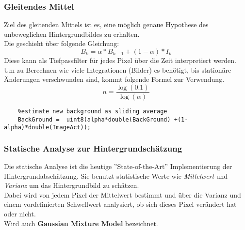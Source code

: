 \subsubsection{Gleitendes Mittel}
Ziel des gleitenden Mittels ist es, eine möglich genaue Hypothese des unbeweglichen Hintergrundbildes zu erhalten.\\
Die geschieht über folgende Gleichung:
\begin{equation}
    B_k = \alpha * B_{k-1} + (1-\alpha) * I_k
\end{equation}
Diese kann als Tiefpassfilter für jedes Pixel über die Zeit interpretiert werden.\\
Um zu Berechnen wie viele Integrationen (Bilder) es benötigt, bis stationäre Änderungen verschwunden sind, kommt folgende Formel zur Verwendung.
\begin{equation}
    n=\frac{\log(0.1)}{\log(\alpha)}
\end{equation}
\begin{lstlisting}
    %estimate new background as sliding average
    BackGround =  uint8(alpha*double(BackGround) +(1-alpha)*double(ImageAct));
\end{lstlisting}
\subsubsection{Statische Analyse zur Hintergrundschätzung}
Die statische Analyse ist die heutige ''State-of-the-Art'' Implementierung der Hintergrundabschätzung. Sie benutzt statistische Werte wie \textit{Mittelwert} und \textit{Varianz} um das Hintergrundbild zu schätzen.\\
Dabei wird von jedem Pixel der Mittelwert bestimmt und über die Varianz und einem vordefinierten Schwellwert analysiert, ob sich dieses Pixel verändert hat oder nicht.\\
Wird auch \textbf{Gaussian Mixture Model} bezeichnet.